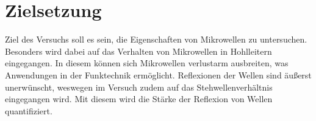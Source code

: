 \section{Zielsetzung}
\label{sec:Zielsetzung}

Ziel des Versuchs soll es sein, die Eigenschaften von Mikrowellen zu untersuchen.
Besonders wird dabei auf das Verhalten von Mikrowellen in Hohlleitern eingegangen.
In diesem können sich Mikrowellen verlustarm ausbreiten, was Anwendungen in der Funktechnik ermöglicht.
Reflexionen der Wellen sind äußerst unerwünscht, weswegen im Versuch zudem auf das Stehwellenverhältnis eingegangen wird.
Mit diesem wird die Stärke der Reflexion von Wellen quantifiziert.